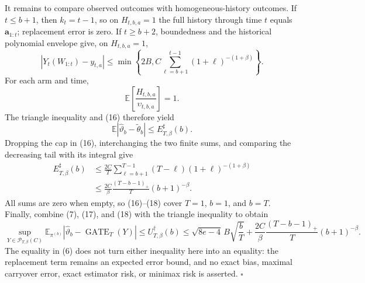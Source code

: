 It remains to compare observed outcomes with homogeneous-history outcomes. If \(t\le b+1\), then \(k_t=t-1\), so on \(H_{t,b,a}=1\) the full history through time \(t\) equals \(\mathbf a_{1:t}\); replacement error is zero. If \(t\ge b+2\), boundedness and the historical polynomial envelope give, on \(H_{t,b,a}=1\),
\[
|Y_t(W_{1:t})-y_{t,a}|
\le\min\left\{2B,C\sum_{\ell=b+1}^{t-1}(1+\ell)^{-(1+\beta)}\right\}.
\tag{16}
\]
For each arm and time,
\[
\mathbb E\left[\frac{H_{t,b,a}}{\upsilon_{t,b,a}}\right]=1.
\]
The triangle inequality and (16) therefore yield
\[
\mathbb E|\widehat\vartheta_b-\widetilde\theta_b|
\le E_{T,\beta}^{\sharp}(b).
\tag{17}
\]
Dropping the cap in (16), interchanging the two finite sums, and comparing the decreasing tail with its integral give
\[
\begin{aligned}
E_{T,\beta}^{\sharp}(b)
&\le\frac{2C}{T}\sum_{\ell=b+1}^{T-1}(T-\ell)(1+\ell)^{-(1+\beta)}\\
&\le\frac{2C}{\beta}\frac{(T-b-1)_+}{T}(b+1)^{-\beta}.
\end{aligned}
\tag{18}
\]
All sums are zero when empty, so (16)--(18) cover \(T=1\), \(b=1\), and \(b=T\). Finally, combine (7), (17), and (18) with the triangle inequality to obtain
\[
\sup_{Y\in\mathcal P_{T,\beta}(C)}
\mathbb E_{\pi^{(b)}}|\widehat\vartheta_b-\operatorname{GATE}_T(Y)|
\le U_{T,\beta}^{\dagger}(b)
\le\sqrt{8e-4}\,B\sqrt{\frac bT}
+\frac{2C}{\beta}\frac{(T-b-1)_+}{T}(b+1)^{-\beta}.
\]
The equality in (6) does not turn either inequality here into an equality: the replacement term remains an expected error bound, and no exact bias, maximal carryover error, exact estimator risk, or minimax risk is asserted. \(\square\)